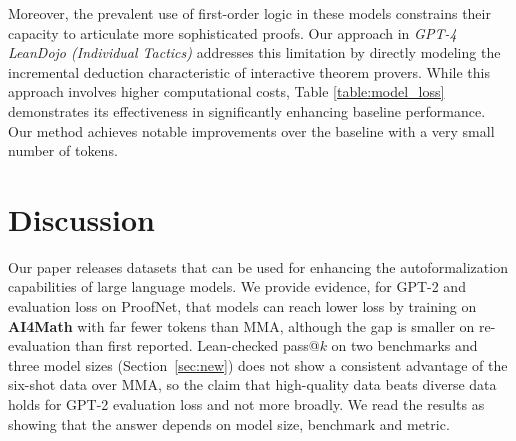 \documentclass{article} %
\begin{document}
Moreover, the prevalent use of first-order logic in these models constrains their capacity to articulate more sophisticated proofs. Our approach in \textit{GPT-4 LeanDojo (Individual Tactics)} addresses this limitation by directly modeling the incremental deduction characteristic of interactive theorem provers. While this approach involves higher computational costs, Table \ref{table:model_loss} demonstrates its effectiveness in significantly enhancing baseline performance. Our method achieves notable improvements over the baseline with a very small number of tokens.

\section{Discussion}

Our paper releases datasets that can be used for enhancing the autoformalization capabilities of large language models. We provide evidence, for GPT-2 and evaluation loss on ProofNet, that models can reach lower loss by training on \textbf{AI4Math} with far fewer tokens than MMA, although the gap is smaller on re-evaluation than first reported. Lean-checked pass@$k$ on two benchmarks and three model sizes (Section~\ref{sec:new}) does not show a consistent advantage of the six-shot data over MMA, so the claim that high-quality data beats diverse data holds for GPT-2 evaluation loss and not more broadly. We read the results as showing that the answer depends on model size, benchmark and metric. \label{discussion}
\end{document}

